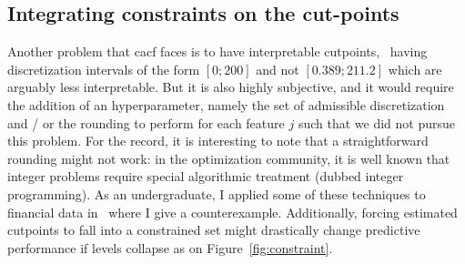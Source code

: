 \subsection{Integrating constraints on the cut-points}

Another problem that \gls{cacf} faces is to have interpretable cutpoints, \ having discretization intervals of the form $[0;200]$ and not $[0.389 ; 211.2]$ which are arguably less interpretable. But it is also highly subjective, and it would require the addition of an hyperparameter, namely the set of admissible discretization and / or the rounding to perform for each feature $j$ such that we did not pursue this problem. For the record, it is interesting to note that a straightforward rounding might not work: in the optimization community, it is well known that integer problems require special algorithmic treatment (dubbed integer programming). As an undergraduate, I applied some of these techniques to financial data in~\cite{} where I give a counterexample. Additionally, forcing estimated cutpoints to fall into a constrained set might drastically change predictive performance if levels collapse as on Figure~\ref{fig:constraint}.

